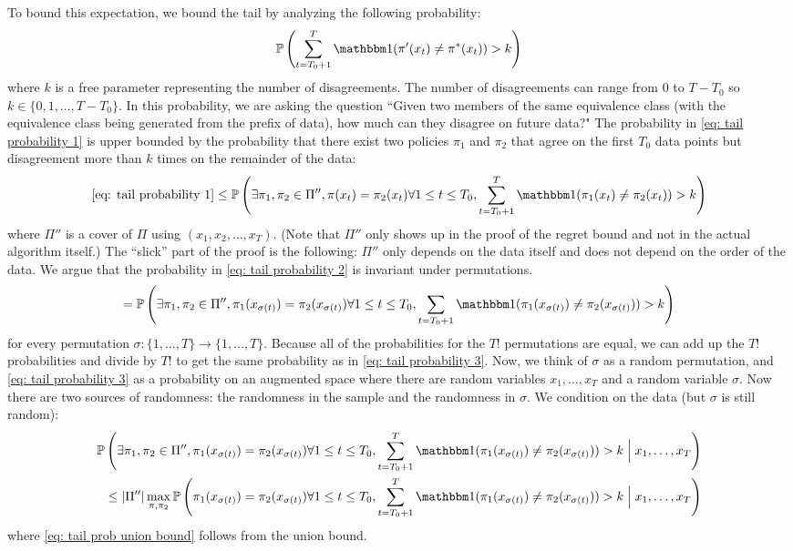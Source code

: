 \documentclass[11pt]{article}
\begin{document}
To bound this expectation, we bound the tail by analyzing the following probability:
\begin{equation}\label{eq: tail probability 1}
\prob{\sum_{t=T_0+1}^T\ind(\pi'(x_t)\neq \pi^*(x_t))>k}
\end{equation}
where $k$ is a free parameter representing the number of disagreements.  The number of disagreements can range from $0$ to $T-T_0$ so $k \in \{0,1,\ldots,T-T_0\}$. In this probability, we are asking the question ``Given two members of the same equivalence class (with the equivalence class being generated from the prefix of data), how much can they disagree on future data?" The probability in \eqref{eq: tail probability 1} is upper bounded by the probability that there exist two policies $\pi_1$ and $\pi_2$ that agree on the first $T_0$ data points but disagreement more than $k$ times on the remainder of the data:
\begin{equation}\label{eq: tail probability 2}
\eqref{eq: tail probability 1}\le \prob{\exists \pi_1,\pi_2 \in \Pi'', \pi(x_t) = \pi_2(x_t) \forall 1 \le t \le T_0, \sum_{t=T_0+1}^T\ind(\pi_1(x_t)\neq \pi_2(x_t)) > k}
\end{equation}
where $\Pi''$ is a cover of $\Pi$ using $(x_1,x_2,\ldots,x_T)$. (Note that $\Pi''$ only shows up in the proof of the regret bound and not in the actual algorithm itself.) The ``slick'' part of the proof is the following: $\Pi''$ only depends on the data itself and does not depend on the order of the data. We argue that the probability in \eqref{eq: tail probability 2} is invariant under permutations. 
\begin{equation}\label{eq: tail probability 3}
=\prob{\exists \pi_1,\pi_2 \in \Pi'', \pi_1(x_{\sigma(t)})= \pi_2(x_{\sigma(t)}) \forall 1 \le t \le T_0, \sum_{t=T_0+1} \ind(\pi_1(x_{\sigma(t)})\neq \pi_2(x_{\sigma(t)})) > k}
\end{equation} 
for every permutation $\sigma: \{1,\ldots,T\} \rightarrow \{1,\ldots,T\}$. Because all of the probabilities for the $T!$ permutations are equal, we can add up the $T!$ probabilities and divide by $T!$ to get the same probability as in \eqref{eq: tail probability 3}. Now, we think of $\sigma$ as a random permutation, and \eqref{eq: tail probability 3} as a probability on an augmented space where there are random variables $x_1,\ldots, x_T$ and a random variable $\sigma$. Now there are two sources of randomness: the randomness in the sample and the randomness in $\sigma$. We condition on the data (but $\sigma$ is still random):
\begin{align}\label{eq: tail probability 4}
\prob{\exists \pi_1,\pi_2 \in \Pi'', \pi_1(x_{\sigma(t)})= \pi_2(x_{\sigma(t)}) \forall 1 \le t \le T_0, \sum_{t=T_0+1}^T \ind(\pi_1(x_{\sigma(t)})\neq \pi_2(x_{\sigma(t)})) > k\;\Big|\;x_1,\ldots,x_T} \\
\le |\Pi''|\max_{\pi,\pi_2} \prob{\pi_1(x_{\sigma(t)})= \pi_2(x_{\sigma(t)}) \forall 1 \le t \le T_0, \sum_{t=T_0+1}^T \ind(\pi_1(x_{\sigma(t)})\neq \pi_2(x_{\sigma(t)})) > k\;\Big|\;x_1,\ldots,x_T}\label{eq: tail prob union bound}
\end{align} 
where \eqref{eq: tail prob union bound} follows from the union bound. 
\end{document}
